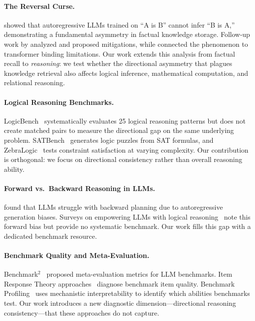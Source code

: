 \documentclass{article}
\begin{document}
\paragraph{The Reversal Curse.}
\citet{berglund2024reversal} showed that autoregressive LLMs trained on ``A is B'' cannot infer ``B is A,'' demonstrating a fundamental asymmetry in factual knowledge storage. Follow-up work by \citet{golovneva2024analysis} analyzed and proposed mitigations, while \citet{allenzhu2025reversal} connected the phenomenon to transformer binding limitations. Our work extends this analysis from factual recall to \emph{reasoning}: we test whether the directional asymmetry that plagues knowledge retrieval also affects logical inference, mathematical computation, and relational reasoning.

\paragraph{Logical Reasoning Benchmarks.}
LogicBench~\citep{parmar2024logicbench} systematically evaluates 25 logical reasoning patterns but does not create matched pairs to measure the directional gap on the same underlying problem. SATBench~\citep{wei2025satbench} generates logic puzzles from SAT formulas, and ZebraLogic~\citep{lin2025zebralogic} tests constraint satisfaction at varying complexity. Our contribution is orthogonal: we focus on directional consistency rather than overall reasoning ability.

\paragraph{Forward vs.\ Backward Reasoning in LLMs.}
\citet{ren2025thinking} found that LLMs struggle with backward planning due to autoregressive generation biases. Surveys on empowering LLMs with logical reasoning~\citep{wang2025empowering} note this forward bias but provide no systematic benchmark. Our work fills this gap with a dedicated benchmark resource.

\paragraph{Benchmark Quality and Meta-Evaluation.}
Benchmark$^2$~\citep{qian2026benchmark} proposed meta-evaluation metrics for LLM benchmarks. Item Response Theory approaches~\citep{zhou2026lost} diagnose benchmark item quality. Benchmark Profiling~\citep{kim2025profiling} uses mechanistic interpretability to identify which abilities benchmarks test. Our work introduces a new diagnostic dimension---directional reasoning consistency---that these approaches do not capture.
\end{document}
